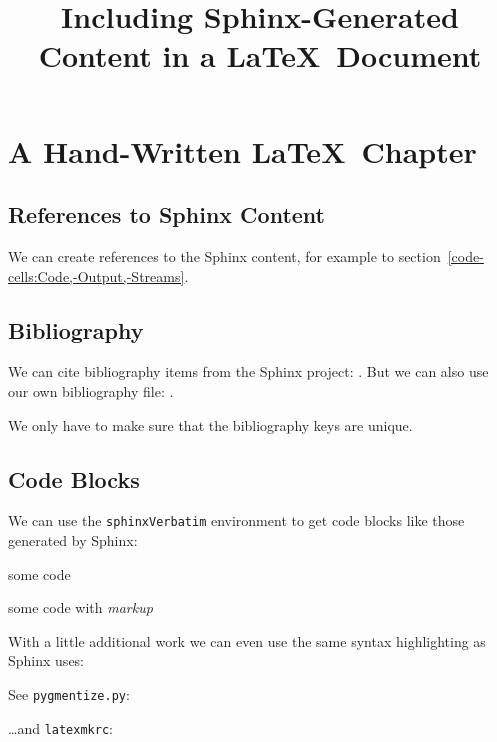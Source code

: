\documentclass[a4paper]{book}
\title{Including Sphinx-Generated Content in a \LaTeX\ Document}
\begin{document}
\maketitle

\tableofcontents

\chapter{A Hand-Written \LaTeX\ Chapter}

\section{References to Sphinx Content}

We can create references to the Sphinx content,
for example to section~\ref{code-cells:Code,-Output,-Streams}.


\section{Bibliography}

We can cite bibliography items from the Sphinx project:
\parencite{perez2011python}.
But we can also use our own bibliography file:
\parencite{knuth1986texbook}.

We only have to make sure that the bibliography keys are unique.

\section{Code Blocks}

We can use the \texttt{sphinxVerbatim} environment
to get code blocks like those generated by Sphinx:

\begin{sphinxVerbatim}
some code
\end{sphinxVerbatim}

\begin{sphinxVerbatim}[commandchars=\\\{\}]
some code with \emph{markup}
\end{sphinxVerbatim}

With a little additional work
we can even use the same syntax highlighting as Sphinx uses:

See \texttt{pygmentize.py}:



\dots and \texttt{latexmkrc}:


\end{document}
